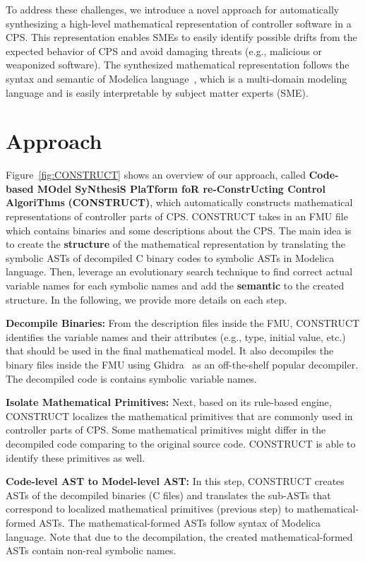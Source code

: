 \documentclass[sigconf,review]{acmart}
\newcommand*\squared[1]{\tikz[baseline=(char.base)]{
\node[shape=rectangle,font=\bfseries,thin,draw=black,fill=yellow,text=black,inner sep=1pt] (char) {#1};}}
\begin{document}
To address these challenges, we introduce a novel approach for automatically synthesizing a high-level mathematical representation of controller software in a CPS. This representation enables SMEs to easily identify possible drifts from the expected behavior of CPS and avoid damaging threats (e.g., malicious or weaponized software). The synthesized mathematical representation follows the syntax and semantic of Modelica language~\cite{fritzson1998modelica}, which is a multi-domain modeling language and is easily interpretable by subject matter experts (SME). 
\vspace{-15pt}
%
\section{Approach}
\label{sec:Construct}
Figure~\ref{fig:CONSTRUCT} shows an overview of our approach, called \textbf{Code-based MOdel SyNthesiS PlaTform foR re-ConstrUcting Control AlgoriThms} \textsc{\textbf{(CONSTRUCT)}}, which automatically constructs mathematical representations of controller parts of CPS. \textsc{CONSTRUCT} takes in an FMU file which contains binaries and some descriptions about the CPS. 
The main idea is to create the \textbf{structure} of the mathematical representation by translating the symbolic ASTs of decompiled C binary codes to symbolic ASTs in Modelica language. Then, leverage an evolutionary search technique to find correct actual variable names for each symbolic names and add the \textbf{semantic} to the created structure. In the following, we provide more details on each step.

    \squared{1} \textbf{Decompile Binaries:} From the description files inside the FMU, \textsc{CONSTRUCT} identifies the variable names and their attributes (e.g., type, initial value, etc.) that should be used in the final mathematical model. It also decompiles the binary files inside the FMU using Ghidra~\cite{Ghidra} as an off-the-shelf popular decompiler. The decompiled code is contains symbolic variable names. 
    
    \squared{2} \textbf{Isolate Mathematical Primitives:} Next, based on its rule-based engine, CONSTRUCT localizes the mathematical primitives that are commonly used in controller parts of CPS. Some mathematical primitives might differ in the decompiled code comparing to the original source code. CONSTRUCT is able to identify these primitives as well. 
    
    \squared{3} \textbf{Code-level AST to Model-level AST:} In this step, CONSTRUCT creates ASTs of the decompiled binaries (C files) and translates the sub-ASTs that correspond to localized mathematical primitives (previous step) to mathematical-formed ASTs. The mathematical-formed ASTs follow syntax of Modelica language. Note that due to the decompilation, the created mathematical-formed ASTs contain non-real symbolic names. %
    
\end{document}
